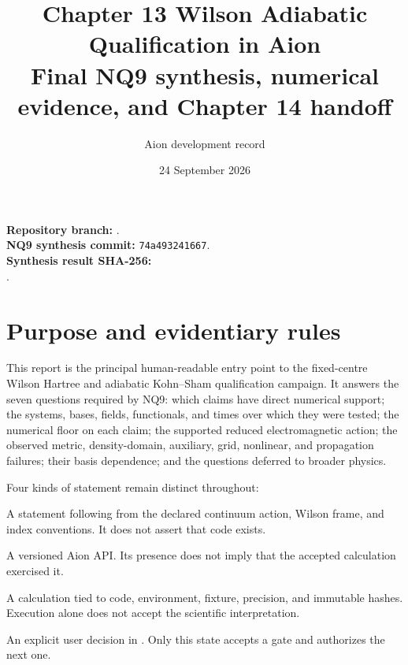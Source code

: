 \documentclass[11pt]{article}
\title{\textbf{Chapter 13 Wilson Adiabatic Qualification in Aion}\\
\large Final NQ9 synthesis, numerical evidence, and Chapter 14 handoff}
\author{Aion development record}
\date{24 September 2026}
\begin{document}
\maketitle

\begin{center}
\end{center}

\vspace{0.5em}
\noindent\textbf{Repository branch:}
.\\
\textbf{NQ9 synthesis commit:} \texttt{74a493241667}.\\
\textbf{Synthesis result SHA-256:}\\
.

\tableofcontents
\listoffigures
\listoftables
\clearpage

\section{Purpose and evidentiary rules}

This report is the principal human-readable entry point to the fixed-centre
Wilson Hartree and adiabatic Kohn--Sham qualification campaign.  It answers
the seven questions required by NQ9: which claims have direct numerical
support; the systems, bases, fields, functionals, and times over which they
were tested; the numerical floor on each claim; the supported reduced
electromagnetic action; the observed metric, density-domain, auxiliary,
grid, nonlinear, and propagation failures; their basis dependence; and the
questions deferred to broader physics.

Four kinds of statement remain distinct throughout:

\begin{description}[style=nextline]
  \item[Mathematical identity]
  A statement following from the declared continuum action, Wilson frame,
  and index conventions.  It does not assert that code exists.
  \item[Reusable implementation]
  A versioned Aion API.  Its presence does not imply that the accepted
  calculation exercised it.
  \item[Executed evidence]
  A calculation tied to code, environment, fixture, precision, and immutable
  hashes.  Execution alone does not accept the scientific interpretation.
  \item[Reviewed evidence]
  An explicit user decision in .  Only this state accepts
  a gate and authorizes the next one.
\end{description}
\end{document}
